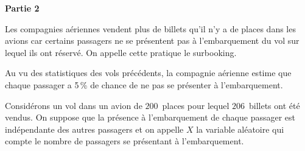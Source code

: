 \documentclass[10pt]{article}
\begin{document}
\textbf{Partie 2}

\medskip

Les compagnies aériennes vendent plus de billets qu'il n'y a de places dans les avions car certains passagers ne se présentent pas à l'embarquement du vol sur lequel ils ont réservé.
On appelle cette pratique le surbooking.

Au vu des statistiques des vols précédents, la compagnie aérienne estime que chaque passager a 5\,\% de chance de ne pas se présenter à l'embarquement.

Considérons un vol dans un avion de $200$~places pour lequel $206$~billets ont été vendus.
On suppose que la présence à l'embarquement de chaque passager est indépendante des autres passagers et on appelle $X$ la variable aléatoire qui compte le nombre de passagers se présentant à l'embarquement.

\medskip
\end{document}
